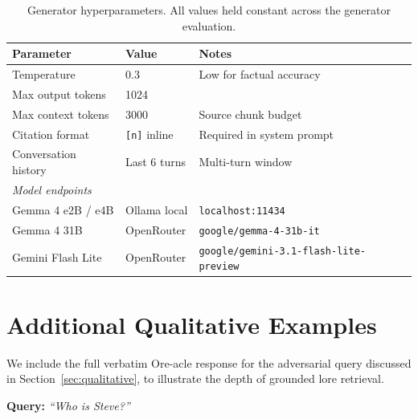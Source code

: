 \documentclass[11pt,a4paper]{article}
\begin{document}
\begin{table}[h]
\caption{Generator hyperparameters. All values held constant across the generator evaluation.}
\label{tab:generator-hyperparams}
\centering
\begin{tabular}{lll}
\toprule
\textbf{Parameter} & \textbf{Value} & \textbf{Notes} \\
\midrule
Temperature & 0.3 & Low for factual accuracy \\
Max output tokens & 1024 & \\
Max context tokens & 3000 & Source chunk budget \\
Citation format & \texttt{[n]} inline & Required in system prompt \\
Conversation history & Last 6 turns & Multi-turn window \\
\midrule
\multicolumn{3}{l}{\textit{Model endpoints}} \\
Gemma 4 e2B / e4B & Ollama local & \texttt{localhost:11434} \\
Gemma 4 31B & OpenRouter & \texttt{google/gemma-4-31b-it} \\
Gemini Flash Lite & OpenRouter & \texttt{google/gemini-3.1-flash-lite-preview} \\
\bottomrule
\end{tabular}

\end{table}

\section{Additional Qualitative Examples}
\label{app:qual}

We include the full verbatim Ore-acle response for the adversarial query discussed in Section~\ref{sec:qualitative}, to illustrate the depth of grounded lore retrieval.

\textbf{Query:} \textit{``Who is Steve?''}
\end{document}
